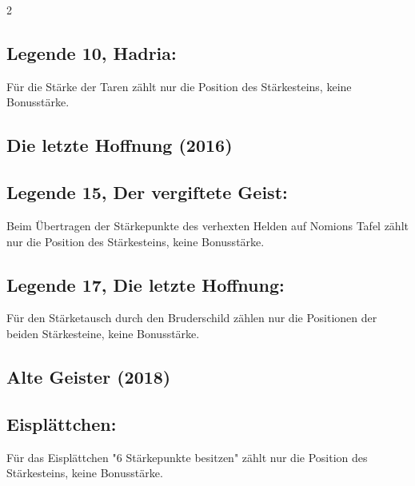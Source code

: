 \documentclass[10pt, a4paper, oneside]{book}
\begin{document}
\begin{multicols*}{2}
\begin{bgcolor}
\subsection{Legende 10, Hadria:}

Für die Stärke der Taren zählt nur die Position des Stärkesteins, keine Bonusstärke.
\supercite{dridn10-taren}

\end{bgcolor}





\begin{bgcolor}
\section{Die letzte Hoffnung (2016)}


\subsection{Legende 15, Der vergiftete Geist:}

Beim Übertragen der Stärkepunkte des verhexten Helden auf Nomions Tafel zählt nur die Position des Stärkesteins, keine Bonusstärke.
\supercite{dlh15-enttarnt}


\subsection{Legende 17, Die letzte Hoffnung:}

Für den Stärketausch durch den Bruderschild zählen nur die Positionen der beiden Stärkesteine, keine Bonusstärke.
\supercite{dh-begleitheft}

\end{bgcolor}




\begin{bgcolor}[color-ag]
\section{Alte Geister (2018)}

\subsection{Eisplättchen:}

Für das Eisplättchen "6 Stärkepunkte besitzen" zählt nur die Position des Stärkesteins, keine Bonusstärke.
\supercite{ag-begleitheft}

\end{bgcolor}



\end{multicols*}
\end{document}
